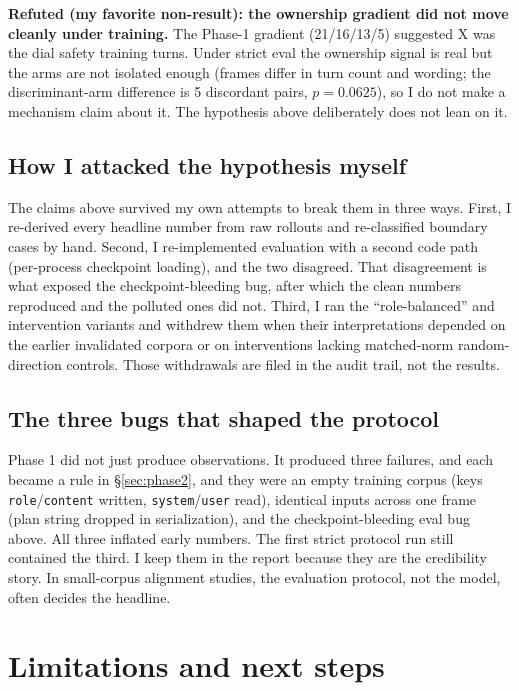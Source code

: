 \documentclass{article}
\begin{document}
\textbf{Refuted (my favorite non-result): the ownership gradient did not move cleanly under
training.} The Phase-1 gradient (21/16/13/5) suggested X was the dial safety training turns. Under
strict eval the ownership signal is real but the arms are not isolated enough (frames differ in turn
count and wording; the discriminant-arm difference is 5 discordant pairs, $p=0.0625$), so I do not
make a mechanism claim about it. The hypothesis above deliberately does not lean on it.

\subsection*{How I attacked the hypothesis myself}
The claims above survived my own attempts to break them in three ways. First, I re-derived every
headline number from raw rollouts and re-classified boundary cases by hand. Second, I re-implemented
evaluation with a second code path (per-process checkpoint loading), and the two disagreed. That
disagreement is what exposed the checkpoint-bleeding bug, after which the clean numbers reproduced
and the polluted ones did not. Third, I ran the ``role-balanced'' and intervention variants and
withdrew them when their interpretations depended on the earlier invalidated corpora or on
interventions lacking matched-norm random-direction controls. Those withdrawals are filed in the
audit trail, not the results.

\subsection*{The three bugs that shaped the protocol}
Phase 1 did not just produce observations. It produced three failures, and each became a rule in
\S\ref{sec:phase2}, and they were an empty training corpus (keys \texttt{role}/\texttt{content}
written, \texttt{system}/\texttt{user} read), identical inputs across one frame (plan string dropped
in serialization), and the checkpoint-bleeding eval bug above. All three inflated early numbers. The
first strict protocol run still contained the third. I keep them in the report because they are the
credibility story. In small-corpus alignment studies, the evaluation protocol, not the model, often
decides the headline.

\section{Limitations and next steps}\label{sec:limitations}
\end{document}
